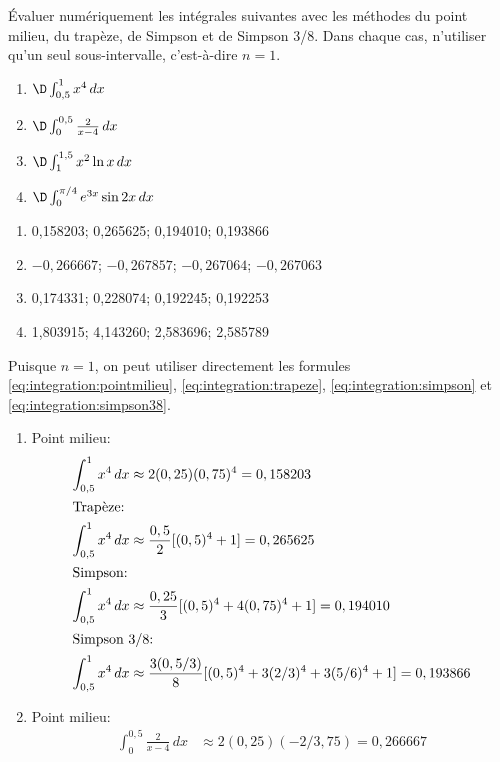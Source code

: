 \begin{exercice}
  Évaluer numériquement les intégrales suivantes avec les méthodes du
  point milieu, du trapèze, de Simpson et de Simpson 3/8. Dans chaque
  cas, n'utiliser qu'un seul sous-intervalle, c'est-à-dire $n = 1$.
  \begin{enumerate}
  \item $\D\int_{0,5}^1 x^4\, dx$
  \item $\D\int_0^{0,5} \frac{2}{x - 4}\, dx$
  \item $\D\int_1^{1,5} x^2 \ln x\, dx$
  \item $\D\int_0^{\pi/4} e^{3x} \sin 2x\, dx$
  \end{enumerate}
  \begin{rep}
    \begin{enumerate}
    \item 0,158203; 0,265625; 0,194010; 0,193866
    \item $-0,266667$; $-0,267857$; $-0,267064$; $-0,267063$
    \item 0,174331; 0,228074; 0,192245; 0,192253
    \item 1,803915; 4,143260; 2,583696; 2,585789
    \end{enumerate}
  \end{rep}
  \begin{sol}
    Puisque $n = 1$, on peut utiliser directement les formules %
    \eqref{eq:integration:pointmilieu}, %
    \eqref{eq:integration:trapeze}, %
    \eqref{eq:integration:simpson} et %
    \eqref{eq:integration:simpson38}.
    \begin{enumerate}
    \item Point milieu:
      \begin{align*}
        \int_{0,5}^1 x^4\, dx &\approx
        2(0,25) (0,75)^4 = 0,158203 \\
        \intertext{Trapèze:}
        \int_{0,5}^1 x^4\, dx &\approx
        \frac{0,5}{2} [(0,5)^4 + 1] = 0,265625 \\
        \intertext{Simpson:}
        \int_{0,5}^1 x^4\, dx &\approx
        \frac{0,25}{3} [(0,5)^4 + 4(0,75)^4 + 1] = 0,194010 \\
        \intertext{Simpson 3/8:}
        \int_{0,5}^1 x^4\, dx &\approx
        \frac{3(0,5/3)}{8} [(0,5)^4 + 3(2/3)^4 + 3(5/6)^4 + 1] = 0,193866
      \end{align*}
    \item Point milieu:
      \begin{align*}
        \int_0^{0,5} \frac{2}{x - 4}\, dx &\approx
        2(0,25) (-2/3,75) = 0,266667 \\

\end{align*}
\end{enumerate}
\end{sol}
\end{exercice}
